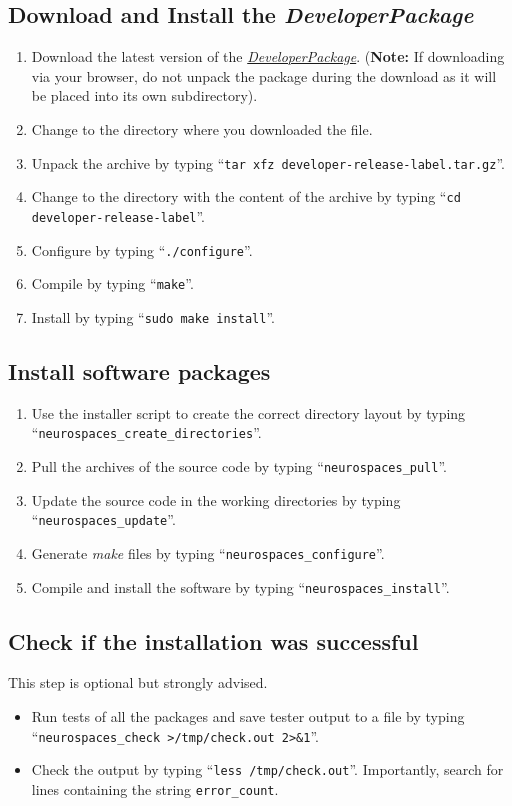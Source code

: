 \documentclass[12pt]{article}
\begin{document}
\subsection*{Download and Install the {\it DeveloperPackage}}

\begin{enumerate}
   \item Download the latest version of the \href{https://github.com/HugoCornelis/developer/blob/master/developer-0.0.0-alpha.tar.gz?raw=true}{{\it DeveloperPackage}}.  ({\bf Note:} If downloading via your browser, do not unpack the package during the download as it will be placed into its own subdirectory).
   \item Change to the directory where you downloaded the file.
   \item Unpack the archive by typing ``{\tt tar xfz developer-release-label.tar.gz}''.
   \item Change to the directory with the content of the archive by typing ``{\tt cd developer-release-label}''.
   \item Configure by typing ``{\tt ./configure}''.
   \item Compile by typing ``{\tt make}''.
   \item Install by typing ``{\tt sudo make install}''. 
\end{enumerate}

\subsection*{Install software packages}

\begin{enumerate}
   \item Use the installer script to create the correct directory layout by typing ``{\tt neurospaces\_create\_directories}''.
   \item Pull the archives of the source code by typing ``{\tt neurospaces\_pull}''.
   \item Update the source code in the working directories by typing ``{\tt neurospaces\_update}''.
   \item Generate {\it make} files by typing ``{\tt neurospaces\_configure}''.
   \item Compile and install the software by typing ``{\tt neurospaces\_install}''.
\end{enumerate}

\subsection*{Check if the installation was successful}

This step is optional but strongly advised.

\begin{itemize}      
   \item[] Run tests of all the packages and save tester output to a file  by typing ``{\tt neurospaces\_check >/tmp/check.out 2>\&1}''.
   \item[] Check the output by typing ``{\tt less /tmp/check.out}''. Importantly, search for lines containing the string {\tt error\_count}.
\end{itemize}
    
\end{document}
